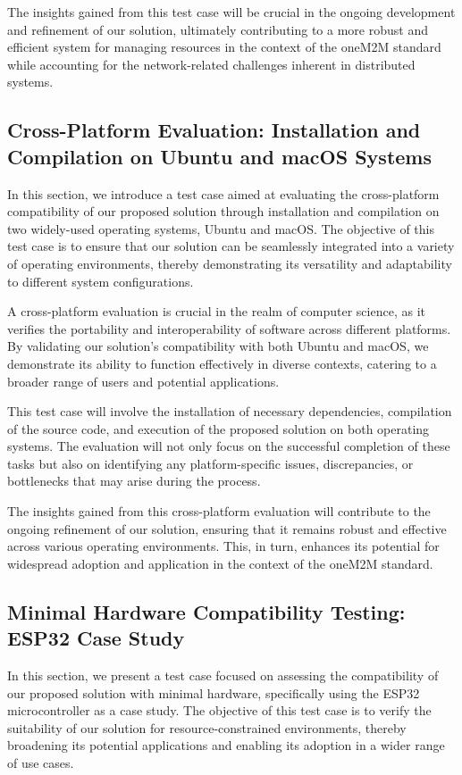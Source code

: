 \documentclass[a4paper,fleqn]{cas-dc}
\begin{document}
The insights gained from this test case will be crucial in the ongoing development and refinement of our solution, ultimately contributing to a more robust and efficient system for managing resources in the context of the oneM2M standard while accounting for the network-related challenges inherent in distributed systems.

\subsection{Cross-Platform Evaluation: Installation and Compilation on Ubuntu and macOS Systems}

In this section, we introduce a test case aimed at evaluating the cross-platform compatibility of our proposed solution through installation and compilation on two widely-used operating systems, Ubuntu and macOS. The objective of this test case is to ensure that our solution can be seamlessly integrated into a variety of operating environments, thereby demonstrating its versatility and adaptability to different system configurations.

A cross-platform evaluation is crucial in the realm of computer science, as it verifies the portability and interoperability of software across different platforms. By validating our solution's compatibility with both Ubuntu and macOS, we demonstrate its ability to function effectively in diverse contexts, catering to a broader range of users and potential applications.

This test case will involve the installation of necessary dependencies, compilation of the source code, and execution of the proposed solution on both operating systems. The evaluation will not only focus on the successful completion of these tasks but also on identifying any platform-specific issues, discrepancies, or bottlenecks that may arise during the process.

The insights gained from this cross-platform evaluation will contribute to the ongoing refinement of our solution, ensuring that it remains robust and effective across various operating environments. This, in turn, enhances its potential for widespread adoption and application in the context of the oneM2M standard.

\subsection{Minimal Hardware Compatibility Testing: ESP32 Case Study}

In this section, we present a test case focused on assessing the compatibility of our proposed solution with minimal hardware, specifically using the ESP32 microcontroller as a case study. The objective of this test case is to verify the suitability of our solution for resource-constrained environments, thereby broadening its potential applications and enabling its adoption in a wider range of use cases.
\end{document}
